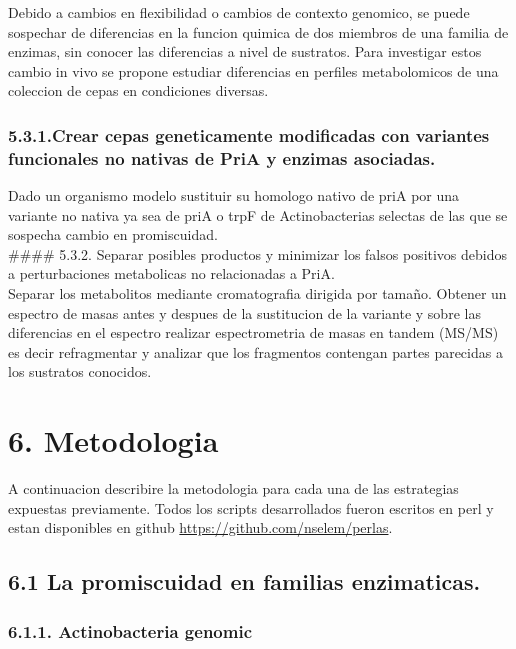\documentclass[12pt,twoside]{reedthesis}
\begin{document}
  Debido a cambios en flexibilidad o cambios de contexto genomico, se
  puede sospechar de diferencias en la funcion quimica de dos miembros de
  una familia de enzimas, sin conocer las diferencias a nivel de
  sustratos. Para investigar estos cambio in vivo se propone estudiar
  diferencias en perfiles metabolomicos de una coleccion de cepas en
  condiciones diversas.
  
  \subsubsection{5.3.1.Crear cepas geneticamente modificadas con variantes
  funcionales no nativas de PriA y enzimas
  asociadas.}\label{crear-cepas-geneticamente-modificadas-con-variantes-funcionales-no-nativas-de-pria-y-enzimas-asociadas.}
  
  Dado un organismo modelo sustituir su homologo nativo de priA por una
  variante no nativa ya sea de priA o trpF de Actinobacterias selectas de
  las que se sospecha cambio en promiscuidad.\\
  \#\#\#\# 5.3.2. Separar posibles productos y minimizar los falsos
  positivos debidos a perturbaciones metabolicas no relacionadas a PriA.\\
  Separar los metabolitos mediante cromatografia dirigida por tamaño.
  Obtener un espectro de masas antes y despues de la sustitucion de la
  variante y sobre las diferencias en el espectro realizar espectrometria
  de masas en tandem (MS/MS) es decir refragmentar y analizar que los
  fragmentos contengan partes parecidas a los sustratos conocidos.
  
  \section{6. Metodologia}\label{metodologia}
  
  A continuacion describire la metodologia para cada una de las
  estrategias expuestas previamente. Todos los scripts desarrollados
  fueron escritos en perl y estan disponibles en github
  \url{https://github.com/nselem/perlas}.
  
  \subsection{6.1 La promiscuidad en familias
  enzimaticas.}\label{la-promiscuidad-en-familias-enzimaticas.-1}
  
  \subsubsection{6.1.1. Actinobacteria
  genomic}\label{actinobacteria-genomic}
  
\end{document}
